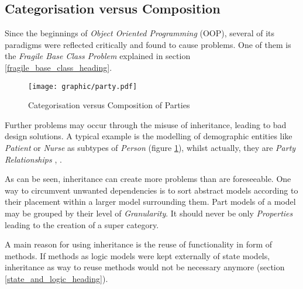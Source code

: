 %
%
%
%
%
%
%

\subsection{Categorisation versus Composition}
\label{categorisation_versus_composition_heading}

Since the beginnings of \emph{Object Oriented Programming} (OOP), several of
its paradigms were reflected critically and found to cause problems. One of
them is the \emph{Fragile Base Class Problem} explained in section
\ref{fragile_base_class_heading}.

\begin{figure}[ht]
    \begin{center}
        \texttt{[image: graphic/party.pdf]}
        \caption{Categorisation versus Composition of Parties \cite[p. 12]{archetypes}}
        \label{party_figure}
    \end{center}
\end{figure}

Further problems may occur through the misuse of inheritance, leading to bad
design solutions. A typical example is the modelling of demographic entities
like \emph{Patient} or \emph{Nurse} as subtypes of \emph{Person} (figure
\ref{party_figure}), whilst actually, they are \emph{Party Relationships}
\cite[p. 12]{archetypes}, \cite{fowler1997}.

As can be seen, inheritance can create more problems than are foreseeable. One
way to circumvent unwanted dependencies is to sort abstract models according to
their placement within a larger model surrounding them. Part models of a model
may be grouped by their level of \emph{Granularity}. It should never be only
\emph{Properties} leading to the creation of a super category.

A main reason for using inheritance is the reuse of functionality in form of
methods. If methods as logic models were kept externally of state models,
inheritance as way to reuse methods would not be necessary anymore (section
\ref{state_and_logic_heading}).
